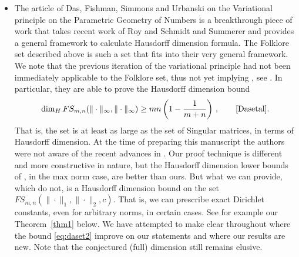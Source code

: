 \documentclass[10pt]{amsart}
\theoremstyle{definition}
\begin{document}
\begin{itemize}
    \item The article of Das, Fishman, Simmons and Urbanski on the Variational principle on the Parametric Geometry of Numbers \cite{Dasetal} is a breakthrough piece of work that takes recent work of Roy \cite{Roy} and Schmidt and Summerer \cite{SchmidtSummerer} and provides a general framework to calculate Hausdorff dimension formula. The Folklore set described above is such a set that fits into their very general framework. We note that the previous iteration of the variational principle had not been immediately applicable to the Folklore set, thus not yet implying \cite{BerGuaMarRamVel}, see \cite[Remark 4.4]{BerGuaMarRamVel}. In particular, they are able to prove the Hausdorff dimension bound
    \begin{equation*} \label{eq:daset2}
        \dim_H FS_{m,n}(\Vert\cdot\Vert_{\infty}, \Vert\cdot\Vert_{\infty}) \geq mn\left(1-\frac{1}{m+n}\right)\, , \quad  \quad \text{\cite[Theorem 3.15]{Dasetal}}. 
    \end{equation*}
    That is, the set is at least as large as the set of Singular matrices, in terms of Hausdorff dimension. At the time of preparing this manuscript the authors were not aware of the recent advances in \cite{Dasetal}. Our proof technique is different and more constructive in nature, but the Hausdorff dimension lower bounds of \cite{Dasetal}, in the max norm case, are better than ours. But what we can provide, which \cite{Dasetal} do not, is a Hausdorff dimension bound on the set $FS_{m,n}(\|\cdot\|_{1},\|\cdot\|_{2},c)$. That is, we can prescribe exact Dirichlet constants, even for arbitrary norms, in certain cases. See for example our Theorem~\ref{thm1} below. We have attempted to make clear throughout where the bound \eqref{eq:daset2} improve on our statements and where our results are new. Note that the conjectured (full) dimension still remains elusive. \par 
    

\end{itemize}
\end{document}
